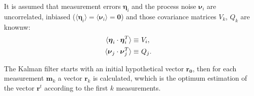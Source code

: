 \documentclass[a4paper]{book}
\let\vec\mathbf  %
\begin{document}
It is assumed that measurement errors $\boldsymbol\eta_i$ and the process noise $\boldsymbol\nu_i$ are uncorrelated, inbiased ($\langle \boldsymbol\eta_i \rangle = \langle \boldsymbol\nu_i \rangle   = \vec{0} $) and those covariance matrices $V_k$, $Q_k$ are knownw:
\begin{align}
\notag
\langle \boldsymbol\eta_i \cdot \boldsymbol\eta_i^T \rangle \equiv &\ V_i, \\
\langle \boldsymbol\nu_j \cdot \boldsymbol\nu_j^T \rangle \equiv &\ Q_j.
\label{eq:VQ}
\end{align}

The Kalman filter starts with an initial hypothetical vector $\vec{r_0}$, then for each measurement $\vec{m}_k$ a vector $\vec{r}_k$ is calculated, wwhich is the optimum estimation of the vector $\vec{r}^t$ according to the first $k$ measurements.
\end{document}
